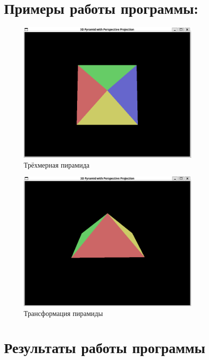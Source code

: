 \newpage
\section*{Примеры работы программы:}
\begin{figure}[h]
    \centering
    \includegraphics[width=0.8\textwidth]{lab2.1.png} %
    \caption{Трёхмерная пирамида}
    \label{fig:lab2}
\end{figure}

\begin{figure}[h]
    \centering
    \includegraphics[width=0.8\textwidth]{lab2.2.png} %
    \caption{Трансформация пирамиды}
    \label{fig:lab2}
\end{figure}

\clearpage

\section*{Результаты работы программы}

